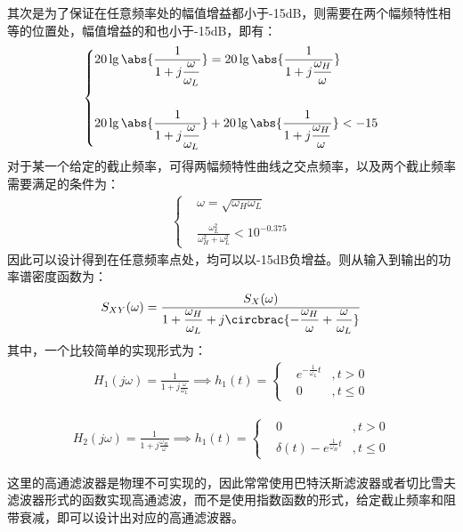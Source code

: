 \documentclass[11pt]{article}
\begin{document}
其次是为了保证在任意频率处的幅值增益都小于-15dB，则需要在两个幅频特性相等的位置处，幅值增益的和也小于-15dB，即有：
\begin{align}
  \left\{
  \begin{aligned}
     & 20\lg\abs{\frac{1}{\displaystyle 1+j\frac{\omega}{\omega_L}}}=20\lg\abs{\frac{1}{\displaystyle 1+j\frac{\omega_H}{\omega}}}     \\\\
     & 20\lg\abs{\frac{1}{\displaystyle 1+j\frac{\omega}{\omega_L}}}+20\lg\abs{\frac{1}{\displaystyle 1+j\frac{\omega_H}{\omega}}}<-15
  \end{aligned}
  \right.
\end{align}
对于某一个给定的截止频率，可得两幅频特性曲线之交点频率，以及两个截止频率需要满足的条件为：
\begin{align*}
  \left\{
  \begin{aligned}
     & \omega=\sqrt{\omega_H\omega_L}                       \\\\
     & \frac{\omega_L^2}{\omega_H^2+\omega_L^2}<10^{-0.375}
  \end{aligned}
  \right.
\end{align*}
因此可以设计得到在任意频率点处，均可以以-15dB负增益。则从输入到输出的功率谱密度函数为：
\begin{align*}
  S_{XY}(\omega)=\frac{S_X(\omega)}{\displaystyle 1+\frac{\omega_H}{\omega_L}+j\circbrac{-\frac{\omega_H}{\omega}+\frac{\omega}{\omega_L}}}
\end{align*}
其中，一个比较简单的实现形式为：
\begin{align*}
  H_1(j\omega)=\frac{1}{\displaystyle 1+j\frac{\omega}{\omega_L}} \implies h_1(t)=\left\{
  \begin{aligned}
     & e^{\displaystyle -\frac{1}{\omega_L}t} & ,  t>0   \\
     & 0                                      & ,  t\le0
  \end{aligned}
  \right.
\end{align*}

\begin{align*}
  H_2(j\omega)=\frac{1}{\displaystyle 1+j\frac{\omega_H}{\omega}} \implies h_1(t)=\left\{
  \begin{aligned}
     & 0                                               & , t>0   \\
     & \delta(t)-e^{\displaystyle \frac{1}{\omega_H}t} & , t\le0
  \end{aligned}
  \right.
\end{align*}\par
这里的高通滤波器是物理不可实现的，因此常常使用巴特沃斯滤波器或者切比雪夫滤波器形式的函数实现高通滤波，而不是使用指数函数的形式，给定截止频率和阻带衰减，即可以设计出对应的高通滤波器。
\end{document}
